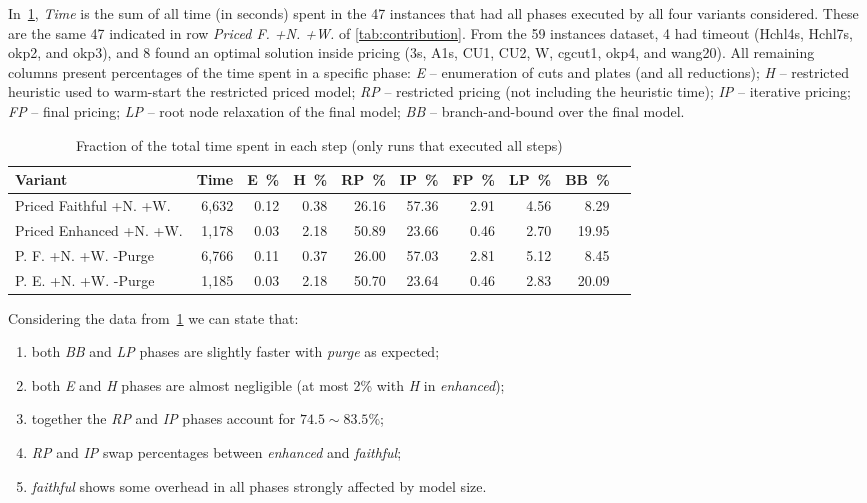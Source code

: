\documentclass[ppgc,prop-tese,english,formais,babel]{iiufrgs}
\begin{document}
In~\cref{tab:time_fractions}, \emph{Time} is the sum of all time (in seconds) spent in the 47 instances that had all phases executed by all four variants considered.
These are the same 47 indicated in row \emph{Priced F. +N. +W.} of \cref{tab:contribution}.
From the 59 instances dataset, 4 had timeout (Hchl4s, Hchl7s, okp2, and okp3), and 8 found an optimal solution inside pricing (3s, A1s, CU1, CU2, W, cgcut1, okp4, and wang20).
All remaining columns present percentages of the time spent in a specific phase:
\emph{E} -- enumeration of cuts and plates (and all reductions);
\emph{H} -- restricted heuristic used to warm-start the restricted priced model;
\emph{RP} -- restricted pricing (not including the heuristic time);
\emph{IP} -- iterative pricing;
\emph{FP} -- final pricing;
\emph{LP} -- root node relaxation of the final model;
\emph{BB} -- branch-and-bound over the final model.

\begin{table}
\centering
{}
\caption{Fraction of the total time spent in each step (only runs that executed all steps)}
\begin{tabular}{lrrrrrrrrr}
\hline\hline
Variant & Time & E~\% & H~\% & RP~\% & IP~\% & FP~\% & LP~\% & BB~\% \\\hline
Priced Faithful +N. +W. & 6,632 & 0.12 & 0.38 & 26.16 & 57.36 & 2.91 & 4.56 & 8.29 \\
Priced Enhanced +N. +W. & 1,178 & 0.03 & 2.18 & 50.89 & 23.66 & 0.46 & 2.70 & 19.95 \\
P. F. +N. +W. -Purge & 6,766 & 0.11 & 0.37 & 26.00 & 57.03 & 2.81 & 5.12 & 8.45 \\
P. E. +N. +W. -Purge & 1,185 & 0.03 & 2.18 & 50.70 & 23.64 & 0.46 & 2.83 & 20.09 \\\hline\hline
\end{tabular}
\label{tab:time_fractions}
\end{table}

Considering the data from~\cref{tab:time_fractions} we can state that:
\begin{enumerate}
\item both \emph{BB} and \emph{LP} phases are slightly faster with \emph{purge} as expected;
\item both \emph{E} and \emph{H} phases are almost negligible (at most 2\% with \emph{H} in \emph{enhanced});
\item together the \emph{RP} and \emph{IP} phases account for \(74.5\sim83.5\)\%;
\item \emph{RP} and \emph{IP} swap percentages between \emph{enhanced} and \emph{faithful};
\item \emph{faithful} shows some overhead in all phases strongly affected by model size.
\end{enumerate}
\end{document}
